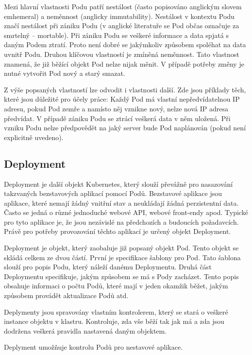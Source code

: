 Mezi hlavní vlastnosti Podu patří nestálost (často popisováno anglickým slovem emhemeral) a neměnnost (anglicky immutability). Nestálost v kontextu Podu značí nestálost při zániku Podu (v anglické literatuře se Pod občas označuje za smrtelný -- mortable). Při zániku Podu se veškeré informace a data spjatá s daným Podem ztratí. Proto není dobré se jakýmkoliv způsobem spoléhat na data uvnitř Podu. Druhou klíčovou vlastností je zmíněná neměnnost. Tato vlastnost znamená, že již běžící objekt Pod nelze nijak měnit. V případě potřeby změny je nutné vytvořit Pod nový a starý smazat. \cite{poulton_2022_the}

Z výše popsaných vlastností lze odvodit i vlastnosti další. Zde jsou příklady těch, které jsou důležité pro účely práce: Každý Pod má vlastní nepředvídatelnou IP adresu, pokud Pod zemře a namísto něj vznikne nový, nelze nová IP adresa předvídat. V případě zániku Podu se ztrácí veškerá data v něm uložená. Při vzniku Podu nelze předpovědět na jaký server bude Pod naplánován (pokud není explicitně uvedeno). 

\subsection{Deployment}
Deployment je další objekt Kubernetes, který slouží převážně pro nasazování takzvaných bezstavových aplikací pomocí Podů. Bezstavové aplikace jsou aplikace, které nemají žádný vnitřní stav a neukládají žádná perzistentní data. Často se jedná o různé jednoduché webové API, webové front-endy apod. Typické pro tyto aplikace je, že jsou nezávislé na předchozích a budoucích požadavcích. Právě pro potřeby provozování těchto aplikací je určený objekt Deployment.

Deployment je objekt, který zaobaluje již popsaný objekt Pod. Tento objekt se skládá celkem ze dvou částí. První je specifikace šablony pro Pod. Tato šablona slouží pro popis Podu, který náleží danému Deploymentu. Druhá část Deploymentu specifikuje, jakým způsobem se má s Pody zacházet. Tento popis obsahuje informaci o počtu Podů, které mají v jeden okamžik běžet, jakým způsobem provádět aktualizace Podů atd.

Deplymenty jsou spravovány vlastním kontrolerem, který se stará o veškeré instance objektu v klastru. Kontroluje, zda vše běží tak jak má a zda jsou dodržena veškerá pravidla nastavená daným objektem. \cite{poulton_2022_the}

Deplyment umožňuje kontrolu Podů pro nestavové aplikace.
